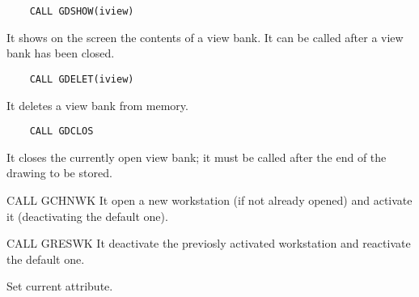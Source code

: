 \ENDCMD


\BEGARG
{}
\ENDARG

\begin{verbatim}
    CALL GDSHOW(iview)
\end{verbatim}
   \par
It shows on the screen the contents of a view bank. It can be called after 
   a view bank has been closed.  

\ENDCMD


\BEGARG
{}
\ENDARG

\begin{verbatim}
    CALL GDELET(iview)
\end{verbatim}
   \par
It deletes a view bank from memory.  

\ENDCMD


\begin{verbatim}
    CALL GDCLOS
\end{verbatim}
   \par
It closes the currently open view bank; it must be called after the end of 
   the drawing to be stored.  

\ENDCMD


   \par
CALL GCHNWK It open a new workstation (if not already opened) and activate 
   it (deactivating the default one).  

\ENDCMD


   \par
CALL GRESWK It deactivate the previosly activated workstation and 
   reactivate the default one.  

\ENDCMD


\BEGARG
{}
\ENDARG

   \par
Set current attribute.  

\ENDCMD


